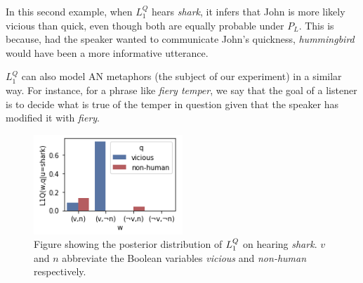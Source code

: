 \documentclass[OpenMind]{stjour}
\newcommand{\Listener}{L}
\newcommand{\QLONE}{\Listener_{{1}}^{{Q}}}
\begin{document}
	In this second example, when $\QLONE$ hears \emph{shark}, it infers that John is more likely vicious than quick, even though both are equally probable under $P_L$. This is because, had the speaker wanted to communicate John's quickness, \emph{hummingbird} would have been a more informative utterance.

	



	
	$\QLONE$ can also model AN metaphors (the subject of our experiment) in a similar way. For instance, for a phrase like \emph{fiery temper}, we say that the goal of a listener is to decide what is true of the temper in question given that the speaker has modified it with \emph{fiery}.





	\begin{figure}
	\centering
	\includegraphics[width=0.5\textwidth]{images/l1posteriorquality.png}
	\caption{Figure showing the posterior distribution of $\protect\QLONE$ on hearing \emph{shark}. $v$ and $n$ abbreviate the Boolean variables \emph{vicious} and \emph{non-human} respectively.}
	\label{fig:l1barplot}
	\end{figure}
\end{document}
